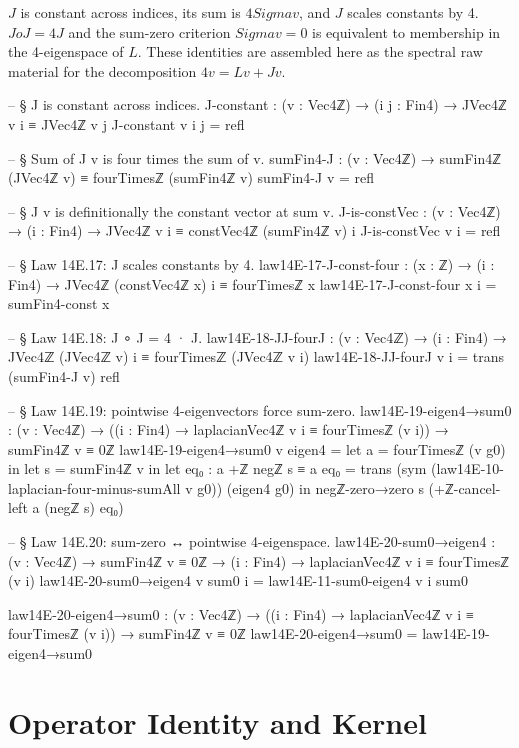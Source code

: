 \documentclass[11pt,a4paper]{book}
\def\Sigma{Sigma}%
\def\circ{o}%
\begin{document}
$J$ is constant across indices, its sum is $4 \Sigma v$, and $J$ scales constants by 4.
$J \circ J = 4J$ and the sum-zero criterion $\Sigma v = 0$ is equivalent to membership in the 4-eigenspace of $L$.
These identities are assembled here as the spectral raw material for the decomposition $4v = Lv + Jv$.

\begin{code}
-- § J is constant across indices.
J-constant : (v : Vec4ℤ) → (i j : Fin4) → JVec4ℤ v i ≡ JVec4ℤ v j
J-constant v i j = refl

-- § Sum of J v is four times the sum of v.
sumFin4-J : (v : Vec4ℤ) → sumFin4ℤ (JVec4ℤ v) ≡ fourTimesℤ (sumFin4ℤ v)
sumFin4-J v = refl

-- § J v is definitionally the constant vector at sum v.
J-is-constVec : (v : Vec4ℤ) → (i : Fin4) → JVec4ℤ v i ≡ constVec4ℤ (sumFin4ℤ v) i
J-is-constVec v i = refl

-- § Law 14E.17: J scales constants by 4.
law14E-17-J-const-four : (x : ℤ) → (i : Fin4) →
  JVec4ℤ (constVec4ℤ x) i ≡ fourTimesℤ x
law14E-17-J-const-four x i = sumFin4-const x

-- § Law 14E.18: J ∘ J = 4 · J.
law14E-18-JJ-fourJ : (v : Vec4ℤ) → (i : Fin4) →
  JVec4ℤ (JVec4ℤ v) i ≡ fourTimesℤ (JVec4ℤ v i)
law14E-18-JJ-fourJ v i =
  trans (sumFin4-J v) refl

-- § Law 14E.19: pointwise 4-eigenvectors force sum-zero.
law14E-19-eigen4→sum0 : (v : Vec4ℤ) → ((i : Fin4) → laplacianVec4ℤ v i ≡ fourTimesℤ (v i)) →
  sumFin4ℤ v ≡ 0ℤ
law14E-19-eigen4→sum0 v eigen4 =
  let a = fourTimesℤ (v g0) in
  let s = sumFin4ℤ v in
  let eq₀ : a +ℤ negℤ s ≡ a
      eq₀ =
        trans
          (sym (law14E-10-laplacian-four-minus-sumAll v g0))
          (eigen4 g0)
  in
  negℤ-zero→zero s (+ℤ-cancel-left a (negℤ s) eq₀)

-- § Law 14E.20: sum-zero ↔ pointwise 4-eigenspace.
law14E-20-sum0→eigen4 : (v : Vec4ℤ) → sumFin4ℤ v ≡ 0ℤ → (i : Fin4) →
  laplacianVec4ℤ v i ≡ fourTimesℤ (v i)
law14E-20-sum0→eigen4 v sum0 i = law14E-11-sum0-eigen4 v i sum0

law14E-20-eigen4→sum0 : (v : Vec4ℤ) → ((i : Fin4) → laplacianVec4ℤ v i ≡ fourTimesℤ (v i)) →
  sumFin4ℤ v ≡ 0ℤ
law14E-20-eigen4→sum0 = law14E-19-eigen4→sum0
\end{code}

\section{Operator Identity and Kernel}
\end{document}
